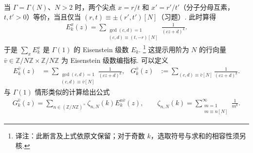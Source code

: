 \begin{example*}
当 $\Gamma=\Gamma(N)$、$N>2$ 时，两个尖点 $x=r/t$ 和 $x'=r'/t'$（分子分母互素，$t,t'>0$）等价，当且仅当 $(r,t)\equiv\pm(r',t')[N]$（习题）. 此时算得
\begin{align*}
E_k^x(z)=\sum_{\substack{\gcd(c,d)=1\\(c,d)\equiv(t,-r)[N]}}\frac{1}{(cz+d)^k}.
\end{align*}
于是 $\sum_xE_k^x$ 是 $\Gamma(1)$ 的 Eisenstein 级数 $E_k$.
\footnote{译注：此断言及上式依原文保留；对于奇数 $k$，选取符号与求和的相容性须另核.}
这提示用阶为 $N$ 的行向量 $\bar v\in\mathbb Z/N\mathbb Z\times\mathbb Z/N\mathbb Z$ 为 Eisenstein 级数编指标. 可以定义
\begin{align*}
E_k^{\bar v}(z)&=\sum_{\substack{\gcd(c,d)=1\\(c,d)\equiv\bar v[N]}}\frac{1}{(cz+d)^k},&
G_k^{\bar v}(z)&:=\sum_{(c,d)\equiv\bar v[N]}\frac{1}{(cz+d)^k}.
\end{align*}
与 $\Gamma(1)$ 情形类似的计算给出公式
\begin{align*}
G_k^{\bar v}(z)=\sum_{n\in(\mathbb Z/N\mathbb Z)^\times}\zeta_{n,N}(k)E_k^{n\bar v}(z),\qquad
\zeta_{n,N}(k)=\sum_{\substack{m=1\\m\equiv n[N]}}^\infty\frac{1}{m^k}.
\end{align*}
\end{example*}
